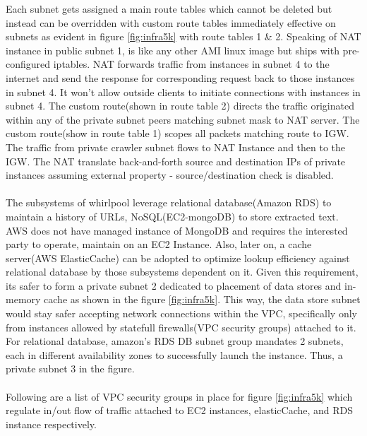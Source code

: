\noindent
Each subnet gets assigned a main route tables which cannot be deleted but instead can be overridden with custom route tables immediately effective on subnets as evident in figure \ref{fig:infra5k} with route tables 1 \& 2. Speaking of NAT instance in public subnet 1, is like any other AMI linux image but ships with pre-configured iptables. NAT forwards traffic from instances in subnet 4 to the internet and send the response for corresponding request back to those instances in subnet 4. It won't allow outside clients to initiate connections with instances in subnet 4. The custom route(shown in route table 2) directs the traffic originated within any of the private subnet peers matching subnet mask  to NAT server. The custom route(show in route table 1) scopes all packets matching  route to IGW. The traffic from private crawler subnet flows to NAT Instance and then to the IGW. The NAT translate back-and-forth source and destination IPs of private instances assuming external property - source/destination check is disabled.
\\
\\
\noindent
The subsystems of whirlpool leverage relational database(Amazon RDS) to maintain a history of URLs, NoSQL(EC2-mongoDB) to store extracted text. AWS does not have managed instance of MongoDB and requires the interested party to operate, maintain on an EC2 Instance. Also, later on, a cache server(AWS ElasticCache) can be adopted to optimize lookup efficiency against relational database by those subsystems dependent on it. Given this requirement, its safer to form a private subnet 2 dedicated to placement of data stores and in-memory cache as shown in the figure \ref{fig:infra5k}. This way, the data store subnet would stay safer accepting network connections within the VPC, specifically only from instances allowed by statefull firewalls(VPC security groups) attached to it. For relational database, amazon's RDS DB subnet group mandates 2 subnets, each in different availability zones to successfully launch the instance. Thus, a private subnet 3 in the figure.
\\
\\
Following are a list of VPC security groups in place for figure \ref{fig:infra5k} which regulate in/out
flow of traffic attached to EC2 instances, elasticCache, and RDS instance respectively.
\\
